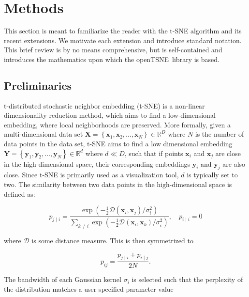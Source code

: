 \documentclass[twocolumn]{bmcart}
\newcommand{\opentsne}{\textsf{openTSNE}}
\begin{document}
\section*{Methods}

This section is meant to familiarize the reader with the t-SNE algorithm and
its recent extensions. We motivate each extension and introduce standard notation.
This brief review is by no means comprehensive, but is
self-contained and introduces the mathematics upon which the \opentsne\ library
is based.

\subsection*{Preliminaries}

t-distributed stochastic neighbor embedding (t-SNE) is a non-linear
dimensionality reduction method, which aims to find a low-dimensional
embedding, where local neighborhoods are preserved. More formally, given a
multi-dimensional data set $\mathbf{X} = \left \{ \mathbf{x}_1, \mathbf{x}_2,
\dots, \mathbf{x}_N \right \} \in \mathbb{R}^D$ where $N$ is the number of data
points in the data set, t-SNE aims to find a low dimensional embedding
$\mathbf{Y} = \left \{ \mathbf{y}_1, \mathbf{y}_2, \dots, \mathbf{y}_N \right
\} \in \mathbb{R}^d$ where $d \ll D$, such that if points $\mathbf{x}_i$ and
$\mathbf{x}_j$ are close in the high-dimensional space, their corresponding
embeddings $\mathbf{y}_i$ and $\mathbf{y}_j$ are also close. Since t-SNE is
primarily used as a visualization tool, $d$ is typically set to two. The
similarity between two data points in the high-dimensional space is defined as:

\begin{equation}
p_{j \mid i} = \frac{\exp \left ( -\frac{1}{2} \mathcal{D}(\mathbf{x}_i, \mathbf{x}_j ) / \sigma_i^2 \right )}
{\sum_{k \neq i } \exp \left ( -\frac{1}{2} \mathcal{D}(\mathbf{x}_i, \mathbf{x}_k ) / \sigma_i^2 \right )}, \quad p_{i \mid i} = 0
\label{eq:gaussian_kernel}
\end{equation}

\noindent where $\mathcal{D}$ is some distance measure. This is then
symmetrized to

\begin{equation}
p_{ij} = \frac{p_{j \mid i} + p_{i \mid j}}{2N}.
\label{eq:symmetrize}
\end{equation}

The bandwidth of each Gaussian kernel $\sigma_i$ is selected such that the
perplexity of the distribution matches a user-specified parameter value
\end{document}
